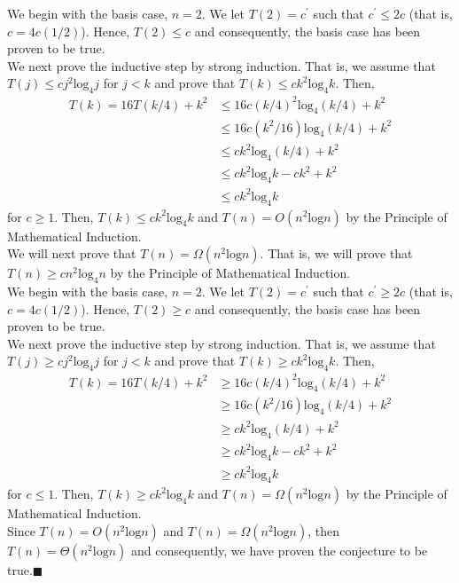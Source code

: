 \documentclass{article}
\begin{document}
\begin{adjustwidth}{2.5em}{0pt}
We begin with the basis case, $n = 2$. We let $T(2) = c^\prime$ such that $c^\prime \leq 2c$ (that is, $c = 4c(1/2)$). Hence, $T(2) \leq c$ and consequently, the basis case has been proven to be true.\\

We next prove the inductive step by strong induction. That is, we assume that $T(j) \leq cj^2\text{log}_4 j$ for $j < k$ and prove that $T(k) \leq ck^2\text{log}_4 k$. Then,
\begin{align*}
T(k) = 16T(k / 4) + k^2 &\leq 16c(k/4)^2 \text{log}_4 (k / 4) + k^2\\
&\leq 16c(k^2/16) \text{log}_4 (k / 4) + k^2\\
&\leq ck^2\text{log}_4 (k / 4) + k^2\\
&\leq ck^2\text{log}_4 k - ck^2 + k^2\\
&\leq ck^2\text{log}_4 k
\end{align*}
for $c \geq 1$. Then, $T(k) \leq ck^2\text{log}_4 k$ and $T(n) = O(n^2\text{log} n)$ by the Principle of Mathematical Induction.\\

We will next prove that $T(n) = \Omega(n^2 \text{log}n).$ That is, we will prove that $T(n) \geq cn^2\text{log}_4 n$ by the Principle of Mathematical Induction.\\

We begin with the basis case, $n = 2$. We let $T(2) = c^\prime$ such that $c^\prime \geq 2c$ (that is, $c = 4c(1/2)$). Hence, $T(2) \geq c$ and consequently, the basis case has been proven to be true.\\

We next prove the inductive step by strong induction. That is, we assume that $T(j) \geq cj^2\text{log}_4 j$ for $j < k$ and prove that $T(k) \geq ck^2\text{log}_4 k$. Then,
\begin{align*}
T(k) = 16T(k / 4) + k^2 &\geq 16c(k/4)^2 \text{log}_4 (k / 4) + k^2\\
&\geq 16c(k^2/16) \text{log}_4 (k / 4) + k^2\\
&\geq ck^2\text{log}_4 (k / 4) + k^2\\
&\geq ck^2\text{log}_4 k - ck^2 + k^2\\
&\geq ck^2\text{log}_4 k
\end{align*}
for $c \leq 1$. Then, $T(k) \geq ck^2\text{log}_4 k$ and $T(n) = \Omega(n^2\text{log} n)$ by the Principle of Mathematical Induction.\\

Since $T(n) = O(n^2\text{log} n)$ and $T(n) = \Omega(n^2\text{log} n)$, then $T(n) = \Theta(n^2\text{log} n)$ and consequently, we have proven the conjecture to be true.\hfill$\blacksquare$\\
\end{adjustwidth}
\end{document}
